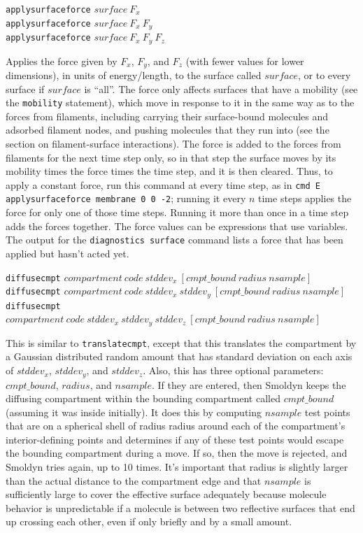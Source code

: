 \documentclass {scrbook}
\newcommand {\ttt} {\texttt}
\begin{document}
\begin{description}
\item{\ttt{applysurfaceforce} $surface\ F_x$\\
\ttt{applysurfaceforce} $surface\ F_x\ F_y$\\
\ttt{applysurfaceforce} $surface\ F_x\ F_y\ F_z$}

Applies the force given by $F_x$, $F_y$, and $F_z$ (with fewer values for lower dimensions), in units of energy/length, to the surface called $surface$, or to every surface if $surface$ is ``all''. The force only affects surfaces that have a mobility (see the \ttt{mobility} statement), which move in response to it in the same way as to the forces from filaments, including carrying their surface-bound molecules and adsorbed filament nodes, and pushing molecules that they run into (see the section on filament-surface interactions). The force is added to the forces from filaments for the next time step only, so in that step the surface moves by its mobility times the force times the time step, and it is then cleared. Thus, to apply a constant force, run this command at every time step, as in \ttt{cmd E applysurfaceforce membrane 0 0 -2}; running it every $n$ time steps applies the force for only one of those time steps. Running it more than once in a time step adds the forces together. The force values can be expressions that use variables. The output for the \ttt{diagnostics surface} command lists a force that has been applied but hasn't acted yet.

\item{\ttt{diffusecmpt} $compartment\ code\ stddev_x\ [cmpt\_bound\ radius\ nsample]$\\
\ttt{diffusecmpt} $compartment\ code\ stddev_x\ stddev_y\ [cmpt\_bound\ radius\ nsample]$\\
\ttt{diffusecmpt} $compartment\ code\ stddev_x\ stddev_y\ stddev_z\ [cmpt\_bound\ radius\ nsample]$}

This is similar to \ttt{translatecmpt}, except that this translates the compartment by a Gaussian distributed random amount that has standard deviation on each axis of $stddev_x$, $stddev_y$, and $stddev_z$. Also, this has three optional parameters: $cmpt\_bound$, $radius$, and $nsample$. If they are entered, then Smoldyn keeps the diffusing compartment within the bounding compartment called $cmpt\_bound$ (assuming it was inside initially). It does this by computing $nsample$ test points that are on a spherical shell of radius radius around each of the compartment's interior-defining points and determines if any of these test points would escape the bounding compartment during a move. If so, then the move is rejected, and Smoldyn tries again, up to 10 times. It's important that radius is slightly larger than the actual distance to the compartment edge and that $nsample$ is sufficiently large to cover the effective surface adequately because molecule behavior is unpredictable if a molecule is between two reflective surfaces that end up crossing each other, even if only briefly and by a small amount.


\end{description}
\end{document}

